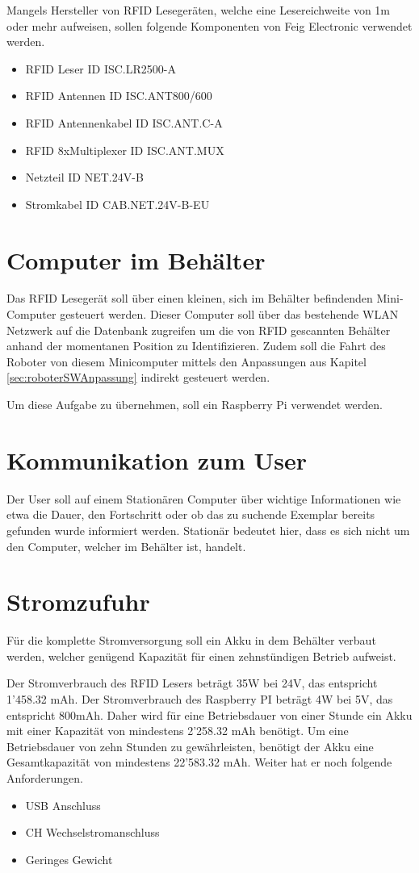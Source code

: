Mangels Hersteller von RFID Lesegeräten, welche eine Lesereichweite von 1m oder mehr aufweisen, sollen folgende Komponenten von Feig Electronic verwendet werden. 
\begin{itemize}
	\item RFID Leser ID ISC.LR2500-A
	\item RFID Antennen ID ISC.ANT800/600
	\item RFID Antennenkabel ID ISC.ANT.C-A
	\item RFID 8xMultiplexer ID ISC.ANT.MUX
	\item Netzteil ID NET.24V-B
	\item Stromkabel ID CAB.NET.24V-B-EU
\end{itemize}

\clearpage
\section{Computer im Behälter}
Das RFID Lesegerät soll über einen kleinen, sich im Behälter befindenden Mini-Computer gesteuert werden. Dieser Computer soll über das bestehende WLAN Netzwerk auf die Datenbank zugreifen um die von RFID gescannten Behälter anhand der momentanen Position zu Identifizieren.  
Zudem soll die Fahrt des Roboter von diesem Minicomputer mittels den Anpassungen aus Kapitel  \ref{sec:roboterSWAnpassung} indirekt gesteuert werden.

Um diese Aufgabe zu übernehmen, soll ein Raspberry Pi verwendet werden.

\section{Kommunikation zum User}
Der User soll auf einem Stationären Computer über wichtige Informationen wie etwa die Dauer, den Fortschritt oder ob das zu suchende Exemplar bereits gefunden wurde informiert werden. Stationär bedeutet hier, dass es sich nicht um den Computer, welcher im Behälter ist, handelt.

\section{Stromzufuhr}
Für die komplette Stromversorgung soll ein Akku in dem Behälter verbaut werden, welcher genügend Kapazität für einen zehnstündigen Betrieb aufweist.

Der Stromverbrauch des RFID Lesers beträgt 35W bei 24V, das entspricht 1'458.32 mAh.
Der Stromverbrauch des Raspberry PI beträgt 4W bei 5V, das entspricht 800mAh.
Daher wird für eine Betriebsdauer von einer Stunde ein Akku mit einer Kapazität von mindestens 2'258.32 mAh benötigt. Um eine Betriebsdauer von zehn Stunden zu gewährleisten, benötigt der Akku eine Gesamtkapazität von mindestens 22'583.32 mAh.
Weiter hat er noch folgende Anforderungen.
\begin{itemize}
	\item USB Anschluss
	\item CH Wechselstromanschluss
	\item Geringes Gewicht
\end{itemize}

